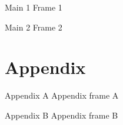 \documentclass[aspectratio=169]{beamer}
\begin{document}
\begin{frame}{Main 1} Frame 1 \end{frame}
\begin{frame}{Main 2} Frame 2 \end{frame}

\appendix
\section{Appendix}

\begin{frame}{Appendix A} Appendix frame A \end{frame}
\begin{frame}{Appendix B} Appendix frame B \end{frame}
\end{document}

